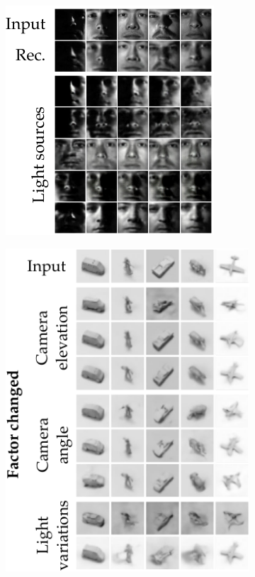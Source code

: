 \begin{figure}[p]
    \begin{subfigure}[b]{0.4\linewidth}
    \includegraphics[width=0.9\linewidth]{images/dualdis_yale.pdf}
    \centering
    \label{dualdis:fig:yale}
    \end{subfigure}
    \hfill
    \begin{subfigure}[b]{0.57\linewidth}
    \includegraphics[width=0.76\linewidth]{images/dualdis_norb.pdf}

\end{subfigure}
\end{figure}

